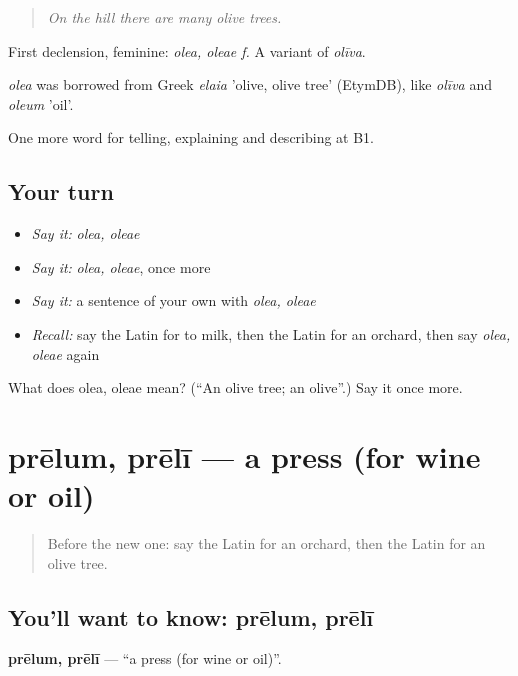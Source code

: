 \begin{quote}
\emph{On the hill there are many olive trees.}
\end{quote}

First declension, feminine: \emph{olea, oleae f.} A variant of \emph{olīva}.

\begin{cousinweb}
\emph{olea} was borrowed from Greek \emph{elaia} 'olive, olive tree' (EtymDB), like \emph{olīva} and \emph{oleum} 'oil'.
\end{cousinweb}

\begin{grammarlens}[title={What you've built}]
One more word for telling, explaining and describing at B1.
\end{grammarlens}

\subsection*{Your turn}
\begin{itemize}
\raggedright
  \item \emph{Say it:} \emph{olea, oleae}
  \item \emph{Say it:} \emph{olea, oleae}, once more
  \item \emph{Say it:} a sentence of your own with \emph{olea, oleae}
  \item \emph{Recall:} say the Latin for to milk, then the Latin for an orchard, then say \emph{olea, oleae} again
\end{itemize}

\begin{tcolorbox}[breakable,colback=teal!4,colframe=teal!35!black,title={Before you move on}]
What does olea, oleae mean? (\textquotedblleft{}An olive tree; an olive\textquotedblright{}.) Say it once more.
\end{tcolorbox}
\section[prēlum, prēlī]{prēlum, prēlī — a press (for wine or oil)}

\label{lesson:LA-C479-prelum}



\begin{quote}
Before the new one: say the Latin for an orchard, then the Latin for an olive tree.
\end{quote}

\subsection*{You'll want to know: prēlum, prēlī}
\textbf{prēlum, prēlī} — \textquotedblleft{}a press (for wine or oil)\textquotedblright{}.

